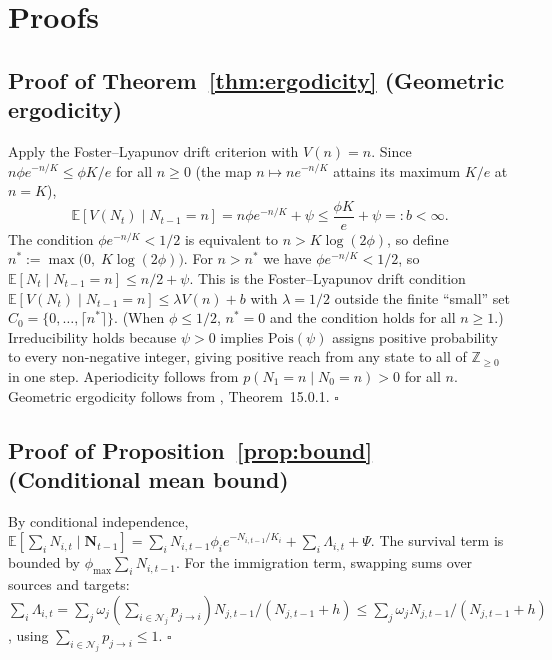 \documentclass[review,12pt]{elsarticle}
\theoremstyle{definition}
\newcommand{\E}{\mathbb{E}}
\begin{document}



\section{Proofs}
\label{app:proofs}

\subsection*{Proof of Theorem~\ref{thm:ergodicity} (Geometric ergodicity)}

Apply the Foster--Lyapunov drift criterion \citep{meyntweedie1993} with $V(n)=n$.
Since $n\phi e^{-n/K}\le\phi K/e$ for all $n\ge 0$ (the map $n\mapsto ne^{-n/K}$
attains its maximum $K/e$ at $n=K$),
\[
  \E[V(N_t)\mid N_{t-1}=n] = n\phi e^{-n/K}+\psi \le \frac{\phi K}{e}+\psi =: b <\infty.
\]
The condition $\phi e^{-n/K}<1/2$ is equivalent to $n > K\log(2\phi)$,
so define $n^* := \max\!\bigl(0,\; K\log(2\phi)\bigr)$.  For $n>n^*$ we have
$\phi e^{-n/K}<1/2$, so
$\E[N_t\mid N_{t-1}=n]\le n/2+\psi$.  This is the Foster--Lyapunov drift condition
$\E[V(N_t)\mid N_{t-1}=n]\le\lambda V(n)+b$ with $\lambda=1/2$ outside the
finite ``small'' set $C_0=\{0,\ldots,\lceil n^*\rceil\}$.
(When $\phi\le1/2$, $n^*=0$ and the condition holds for all $n\ge 1$.)
Irreducibility holds because $\psi>0$ implies $\mathrm{Pois}(\psi)$ assigns
positive probability to every non-negative integer, giving positive reach
from any state to all of $\mathbb{Z}_{\ge0}$ in one step.  Aperiodicity
follows from $p(N_1=n\mid N_0=n)>0$ for all $n$.
Geometric ergodicity follows from \citet{meyntweedie1993}, Theorem~15.0.1.
\hfill$\square$

\subsection*{Proof of Proposition~\ref{prop:bound} (Conditional mean bound)}

By conditional independence, $\E[\sum_i N_{i,t}\mid\bm{N}_{t-1}]
= \sum_i N_{i,t-1}\phi_i e^{-N_{i,t-1}/K_i} + \sum_i\Lambda_{i,t} + \Psi$.
The survival term is bounded by $\phi_{\max}\sum_i N_{i,t-1}$.
For the immigration term, swapping sums over sources and targets:
$\sum_i\Lambda_{i,t}=\sum_j\omega_j(\sum_{i\in\mathcal{N}_j}p_{j\to i})
 N_{j,t-1}/(N_{j,t-1}+h)\le\sum_j\omega_j N_{j,t-1}/(N_{j,t-1}+h)$,
using $\sum_{i\in\mathcal{N}_j}p_{j\to i}\le1$.
\hfill$\square$
\end{document}
